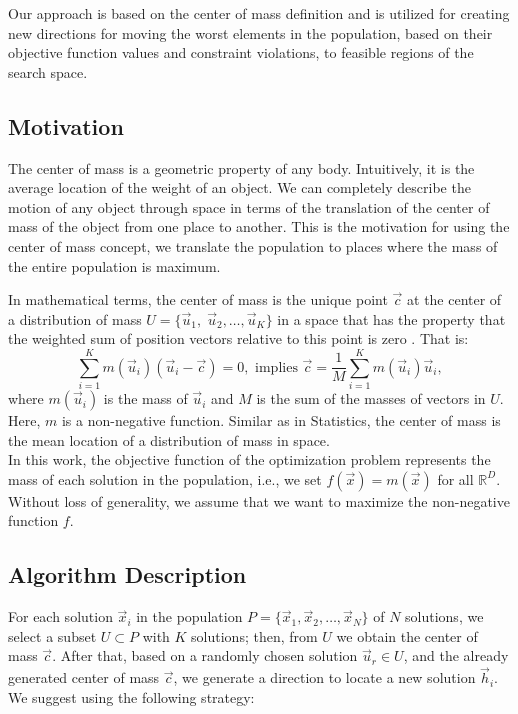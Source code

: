\documentclass[conference]{IEEEtran}
\begin{document}
Our approach is based on the center of mass definition and is utilized for creating 
new directions for moving the worst  elements in the population, based on their 
objective function values and constraint violations, to feasible regions of the 
search space.

%
%
\subsection{Motivation} %
The center of mass is a geometric property of any body. Intuitively, it is the 
average location of the weight of an object. We can completely describe the motion 
of any object through space in terms of the translation of the center of mass of 
the object from one place to another. This is the motivation for using the center 
of mass concept, we translate the population to places where the mass of the entire 
population is maximum.
% 

In mathematical terms, the center of mass is the unique point $\vec{c}$ at the 
center of a distribution of mass $U = \{\vec{u}_1,\; \vec{u}_2 , \ldots , \vec{u}_K \}$ 
in a space that has the property that the weighted sum of position vectors 
relative to this point  is zero \cite{kleppner73,serway}. That is:
%
%
\begin{equation}
	\sum_{i = 1}^K m(\vec{u}_i) (\vec{u}_i - \vec{c}) = 0, \text{ implies } 
	\vec{c} = \dfrac{1}{M} \sum_{i = 1}^K  m(\vec{u}_i)  \vec{u}_i,
	\label{eq:masscenter}
\end{equation}
%
%
where $m(\vec{u}_i)$ is the mass of $\vec{u}_i$ and  $M$ is the sum of the 
masses of vectors in $U$. Here, $m$ is a non-negative function. Similar as in 
Statistics, the center of mass is the mean location of a distribution 
of mass in space.\\


In this work, the objective function of the optimization problem represents 
the mass of each solution in the population,  i.e., we set $f(\vec{x}) = m(\vec{x})$ 
for all $\mathbb{R}^D$.  Without loss of generality, we assume that we want to 
maximize  the non-negative function $f$.




\subsection{Algorithm Description} %
\label{sub:algorithm_description}

For each solution $\vec{x}_i $ in the population $P = \{ \vec{x}_1, \vec{x}_2, \ldots, \vec{x}_{N} \} $ 
of $N$  solutions, we select a subset $U \subset P $ with $K$ solutions; then, 
from $U$ we obtain the center of mass $\vec{c}$. After that, based on 
a randomly chosen solution $\vec{u}_r \in U$,  
and the already generated center of mass $\vec{c}$, we generate a direction 
to locate a new solution $ \vec{h}_i$. We suggest using the following strategy:
\end{document}
